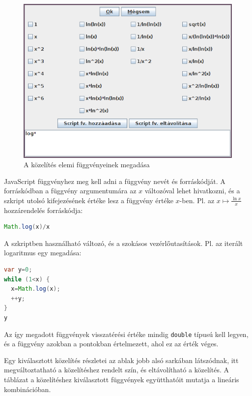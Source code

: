 \begin{figure}[H]
\caption{A közelítés elemi függvényeinek megadása}
\centering
\includegraphics[scale=0.75]{functions}
\end{figure}

JavaScript függvényhez meg kell adni a függvény nevét és forráskódját.
A forráskódban a függvény argumentumára az $x$ változóval lehet hivatkozni, és a szkript utolsó kifejezésének értéke lesz a függvény értéke $x$-ben.
Pl. az $x \mapsto \frac{\ln{x}}{x}$ hozzárendelés forráskódja:

\begin{lstlisting}[basicstyle=\small, language=Java]
Math.log(x)/x
\end{lstlisting}

A szkriptben használható változó, és a szokásos vezérlőutasítások.
Pl. az iterált logaritmus egy megadása:
\begin{lstlisting}[basicstyle=\small, language=Java,morekeywords=var]
var y=0;
while (1<x) {
  x=Math.log(x);
  ++y;
}
y
\end{lstlisting}

Az így megadott függvények visszatérési értéke mindig \texttt{double} típusú kell legyen,
és a függvény azokban a pontokban értelmezett, ahol ez az érték véges.

Egy kiválasztott közelítés részletei az ablak jobb alsó sarkában látszódnak, itt megváltoztatható a közelítéshez rendelt szín, és eltávolítható a közelítés.
A táblázat a közelítéshez kiválasztott függvények együtthatóit mutatja a lineáris kombinációban.

